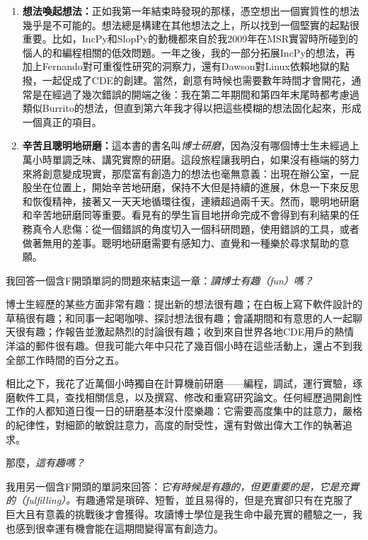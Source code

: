 \documentclass[12pt,UTF8,nofonts]{book}
\newcommand{\bookname}{博士研磨}
\begin{document}
\begin{enumerate}
  \item \textbf{想法喚起想法：}正如我第一年結束時發現的那樣，憑空想出一個實質性的想法幾乎是不可能的。想法總是構建在其他想法之上，所以找到一個堅實的起點很重要。比如，IncPy和SlopPy的動機都來自於我2009年在MSR實習時所碰到的惱人的和編程相關的低效問題。一年之後，我的一部分拓展IncPy的想法，再加上Fernando對可重復性研究的洞察力，還有Dawson對Linux依賴地獄的點撥，一起促成了CDE的創建。當然，創意有時候也需要數年時間才會開花，通常是在經過了幾次錯誤的開端之後：我在第二年期間和第四年末尾時都考慮過類似Burrito的想法，但直到第六年我才得以把這些模糊的想法固化起來，形成一個真正的項目。
  \item \textbf{辛苦且聰明地研磨：}這本書的書名叫\emph{\bookname}，因為沒有哪個博士生未經過上萬小時單調乏味、講究實際的研磨。這段旅程讓我明白，如果沒有極端的努力來將創意變成現實，那麼富有創造力的想法也毫無意義：出現在辦公室，一屁股坐在位置上，開始辛苦地研磨，保持不大但是持續的進展，休息一下來反思和恢復精神，接著又一天天地循環往復，連續超過兩千天。然而，聰明地研磨和辛苦地研磨同等重要。看見有的學生盲目地拼命完成不會得到有利結果的任務真令人悲傷：從一個錯誤的角度切入一個科研問題，使用錯誤的工具，或者做著無用的差事。聰明地研磨需要有感知力、直覺和一種樂於尋求幫助的意願。
\end{enumerate}

\breakline

我回答一個含F開頭單詞的問題來結束這一章：\emph{讀博士有趣（fun）嗎？}

博士生經歷的某些方面非常有趣：提出新的想法很有趣；在白板上寫下軟件設計的草稿很有趣；和同事一起喝咖啡、探討想法很有趣；會議期間和有意思的人一起聊天很有趣；作報告並激起熱烈的討論很有趣；收到來自世界各地CDE用戶的熱情洋溢的郵件很有趣。但我可能六年中只花了幾百個小時在這些活動上，還占不到我全部工作時間的百分之五。

相比之下，我花了近萬個小時獨自在計算機前研磨——編程，調試，運行實驗，琢磨軟件工具，查找相關信息，以及撰寫、修改和重寫研究論文。任何經歷過開創性工作的人都知道日復一日的研磨基本沒什麼樂趣：它需要高度集中的註意力，嚴格的紀律性，對細節的敏銳註意力，高度的耐受性，還有對做出偉大工作的執著追求。

那麼，\emph{這有趣嗎？}

我用另一個含F開頭的單詞來回答：\emph{它有時候是有趣的，但更重要的是，它是充實的（fulfilling）。}有趣通常是瑣碎、短暫，並且易得的，但是充實卻只有在克服了巨大且有意義的挑戰後才會獲得。攻讀博士學位是我生命中最充實的體驗之一，我也感到很幸運有機會能在這期間變得富有創造力。
\end{document}
